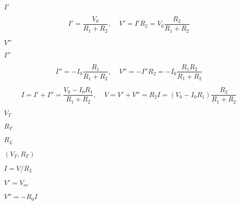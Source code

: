 {\newpage\clearpage
{}%
$I'$%
\lthtmlinlinemathZ
\lthtmlcheckvsize\clearpage}

{\newpage\clearpage
{}%
\begin{displaymath} I'=\frac{V_0}{R_1+R_2},\;\;\;\;V'=I'R_2=V_0\frac{R_2}{R_1+R_2} \end{displaymath}%
\lthtmldisplayZ
\lthtmlcheckvsize\clearpage}

{\newpage\clearpage
{}%
$V''$%
\lthtmlinlinemathZ
\lthtmlcheckvsize\clearpage}

{\newpage\clearpage
{}%
$I''$%
\lthtmlinlinemathZ
\lthtmlcheckvsize\clearpage}

{\newpage\clearpage
{}%
\begin{displaymath} I''=-I_0\frac{R_1}{R_1+R_2},\;\;\;\;V''=-I''R_2=-I_0\frac{R_1R_2}{R_1+R_2} \end{displaymath}%
\lthtmldisplayZ
\lthtmlcheckvsize\clearpage}

{\newpage\clearpage
{}%
\begin{displaymath} I=I'+I''=\frac{V_0-I_0R_1}{R_1+R_2},\;\;\;\;
  V=V'+V''=R_2I=(V_0-I_0R_1)\frac{R_2}{R_1+R_2}	\end{displaymath}%
\lthtmldisplayZ
\lthtmlcheckvsize\clearpage}

{\newpage\clearpage
{}%
$V_T$%
\lthtmlinlinemathZ
\lthtmlcheckvsize\clearpage}

{\newpage\clearpage
{}%
$R_T$%
\lthtmlinlinemathZ
\lthtmlcheckvsize\clearpage}

{\newpage\clearpage
{}%
$R_L$%
\lthtmlinlinemathZ
\lthtmlcheckvsize\clearpage}

{\newpage\clearpage
{}%
$(V_T, R_T)$%
\lthtmlinlinemathZ
\lthtmlcheckvsize\clearpage}

{\newpage\clearpage
{}%
$I=V/R_L$%
\lthtmlinlinemathZ
\lthtmlcheckvsize\clearpage}

{\newpage\clearpage
{}%
$V'=V_{oc}$%
\lthtmlinlinemathZ
\lthtmlcheckvsize\clearpage}

{\newpage\clearpage
{}%
$V''=-R_0I$%
\lthtmlinlinemathZ
\lthtmlcheckvsize\clearpage}

